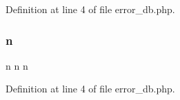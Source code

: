 Definition at line 4 of file error\+\_\+db.\+php.

\mbox{\label{cli_2error__db_8php_ace0fd03cd383f20ce6ea63247a207294}} 
\subsubsection{\texorpdfstring{n}{n}}
{\footnotesize\ttfamily n n n}



Definition at line 4 of file error\+\_\+db.\+php.

